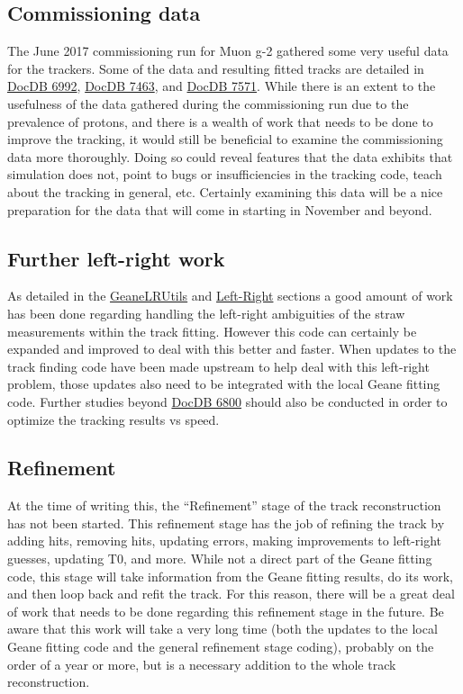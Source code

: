 	\subsection{Commissioning data}

		The June 2017 commissioning run for Muon g-2 gathered some very useful data for the trackers. Some of the data and resulting fitted tracks are detailed in \href{https://gm2-docdb.fnal.gov/cgi-bin/private/ShowDocument?docid=6992}{DocDB 6992}, \href{https://gm2-docdb.fnal.gov/cgi-bin/private/ShowDocument?docid=7463}{DocDB 7463}, and \href{https://gm2-docdb.fnal.gov/cgi-bin/private/ShowDocument?docid=7571}{DocDB 7571}. While there is an extent to the usefulness of the data gathered during the commissioning run due to the prevalence of protons, and there is a wealth of work that needs to be done to improve the tracking, it would still be beneficial to examine the commissioning data more thoroughly. Doing so could reveal features that the data exhibits that simulation does not, point to bugs or insufficiencies in the tracking code, teach about the tracking in general, etc. Certainly examining this data will be a nice preparation for the data that will come in starting in November and beyond.

	\subsection{Further left-right work}

		As detailed in the \hyperref[sec:GeaneLRUtils]{GeaneLRUtils} and \hyperref[sec:LR]{Left-Right} sections a good amount of work has been done regarding handling the left-right ambiguities of the straw measurements within the track fitting. However this code can certainly be expanded and improved to deal with this better and faster. When updates to the track finding code have been made upstream to help deal with this left-right problem, those updates also need to be integrated with the local Geane fitting code. Further studies beyond \href{https://gm2-docdb.fnal.gov/cgi-bin/private/ShowDocument?docid=6800}{DocDB 6800} should also be conducted in order to optimize the tracking results vs speed.

	\subsection{Refinement}

		At the time of writing this, the ``Refinement'' stage of the track reconstruction has not been started. This refinement stage has the job of refining the track by adding hits, removing hits, updating errors, making improvements to left-right guesses, updating T0, and more. While not a direct part of the Geane fitting code, this stage will take information from the Geane fitting results, do its work, and then loop back and refit the track. For this reason, there will be a great deal of work that needs to be done regarding this refinement stage in the future. Be aware that this work will take a very long time (both the updates to the local Geane fitting code and the general refinement stage coding), probably on the order of a year or more, but is a necessary addition to the whole track reconstruction.

